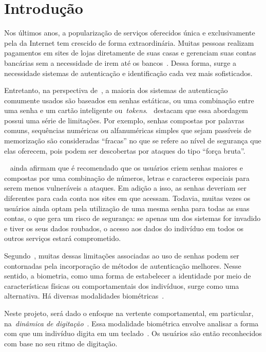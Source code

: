 \section{Introdução}\label{sec:introduacao}

Nos últimos anos, a popularização de serviços oferecidos única e exclusivamente pela da Internet tem crescido de forma extraordinária. Muitas pessoas realizam pagamentos em sites de lojas diretamente de suas casas e gerenciam suas contas bancárias sem a necessidade de irem até os bancos~\cite{seguranca_de_dados}. Dessa forma, surge a necessidade sistemas de autenticação e identificação cada vez mais sofisticados.

Entretanto, na perspectiva de~, a maioria dos sistemas de autenticação comumente usados são baseados em senhas estáticas, ou uma combinação entre uma senha e um cartão inteligente ou~\textit{tokens}.~ destacam que essa abordagem possui uma série de limitações. Por exemplo, senhas compostas por palavras comuns, sequências numéricas ou alfanuméricas simples que sejam passíveis de memorização são consideradas ``fracas'' no que se refere ao nível de segurança que elas oferecem, pois podem ser descobertas por ataques do tipo ``força bruta''.

~ ainda afirmam que é recomendado que os usuários criem senhas maiores e compostas por uma combinação de números, letras e caracteres especiais para serem menos vulneráveis a ataques. Em adição a isso, as senhas deveriam ser diferentes para cada conta nos sites em que acessam. Todavia, muitas vezes os usuários ainda optam pela utilização de uma mesma senha para todas as suas contas, o que gera um risco de segurança: se apenas um dos sistemas for invadido e tiver os seus dados roubados, o acesso aos dados do indivíduo em todos os outros serviços estará comprometido.

Segundo~, muitas dessas limitações associadas ao uso de senhas podem ser contornadas pela incorporação de métodos de autenticação melhores. Nesse sentido, a biometria, como uma forma de estabelecer a identidade por meio de características físicas ou comportamentais dos indivíduos, surge como uma alternativa. Há diversas modalidades biométricas~\cite{Jain2016_50Years}.

Neste projeto, será dado o enfoque na vertente comportamental, em particular, na~\textit{dinâmica de digitação}~\cite{Roy2022systematic}. Essa modalidade biométrica envolve analisar a forma com que um indivíduo digita em um teclado~\cite{monrose2000keystroke}. Os usuários são então reconhecidos com base no seu ritmo de digitação.

